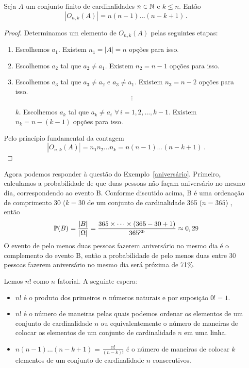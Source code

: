 \begin{proposição}\label{prop_card_ord}
Seja $A$ um conjunto finito de cardinalidades $n \in \mathbb{N}$ e $k \leq n$. Então
\begin{equation}
|O_{n,k}(A)| = n(n-1)\dots(n-k+1) \,.
\end{equation}
\end{proposição}
\begin{proof}
Determinamos um elemento de $O_{n,k}(A)$ pelas seguintes etapas:
\begin{enumerate}
\item Escolhemos $a_1$. Existem $n_1=|A|=n$ opções para isso.
\item Escolhemos $a_2$ tal que $a_2 \neq a_1$. Existem $n_2=n-1$ opções para isso.
\item Escolhemos $a_3$ tal que $a_3 \neq a_2$ e $a_3 \neq a_1$. Existem $n_3=n-2$ opções para isso.
$$\vdots$$

\item[$k$.] Escolhemos $a_k$ tal que $a_k \neq a_i$ $\forall \, i=1,2,\dots,k-1$. Existem $n_k=n-(k-1)$ opções para isso.
\end{enumerate}
Pelo princípio fundamental da contagem
\begin{equation}
|O_{n,k}(A)| = n_1n_2\dots n_k=n(n-1)\dots(n-k+1) \,.
\end{equation}
\end{proof}

\begin{exemplo}[continuação]
     Agora podemos responder à questão do Exemplo~\ref{aniversário}. Primeiro, calculamos a probabilidade de que duas pessoas não façam aniversário no mesmo dia, correspondendo ao evento B. Conforme discutido acima, B é uma ordenação de comprimento 30 ($k=30$ de um conjunto de cardinalidade 365 ($n=365$) , então
     \begin{equation}
     \mathbb{P}(B) = \frac{|B|}{|\Omega|} = \frac{365\times\cdots\times(365-30+1)}{365^{30}} \approx 0,29
     \end{equation}
     O evento de pelo menos duas pessoas fazerem aniversário no mesmo dia é o complemento do evento B, então a probabilidade de pelo menos duas entre 30 pessoas fazerem aniversário no mesmo dia será próxima de 71\%.
\end{exemplo}

\begin{remarks*}
Lemos $n!$ como $n$ fatorial. A seguinte espera:
\begin{itemize}
\item $n!$ é o produto dos primeiros $n$ números naturais e por suposição $0!=1$.
\item $n!$ é o número de maneiras pelas quais podemos ordenar os elementos de um conjunto de cardinalidade $n$ ou equivalentemente o número de maneiras de colocar os elementos de um conjunto de cardinalidade $n$ em uma linha.
\item $n(n-1)\dots(n-k+1)$ = $\frac{n!}{(n-k)!}$ é o número de maneiras de colocar $k$ elementos de um conjunto de cardinalidade $n$ consecutivos.
\end{itemize}
\end{remarks*}

